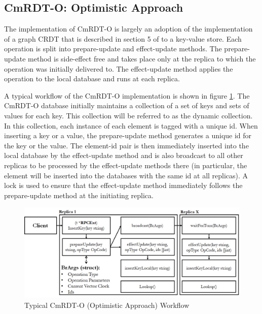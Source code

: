 \documentclass[sigconf,nonacm,11pt]{acmart}
\begin{document}
\subsection{CmRDT-O: Optimistic Approach}
The implementation of CmRDT-O is largely an adoption of the implementation of a graph CRDT that is described in section 5 of \cite{shapiro2011conflict} to a key-value store. Each operation is split into prepare-update and effect-update methods. The prepare-update method is side-effect free and takes place only at the replica to which the operation was initially delivered to. The effect-update method applies the operation to the local database and runs at each replica.

A typical workflow of the CmRDT-O implementation is shown in figure \ref{fig:cmrdtb}. The CmRDT-O database initially maintains a collection of a set of keys and sets of values for each key. This collection will be referred to as the dynamic collection. In this collection, each instance of each element is tagged with a unique id. When inserting a key or a value, the prepare-update method generates a unique id for the key or the value. The element-id pair is then immediately inserted into the local database by the effect-update method and is also broadcast to all other replicas to be processed by the effect-update methods there (in particular, the element will be inserted into the databases with the same id at all replicas). A lock is used to ensure that the effect-update method immediately follows the prepare-update method at the initiating replica.

\begin{figure}[h]
  \centering
  \includegraphics[width=15.5cm]{Fig4CmRDTB}
  \caption{Typical CmRDT-O (Optimistic Approach) Workflow}
  \label{fig:cmrdtb}
\end{figure}
\end{document}

